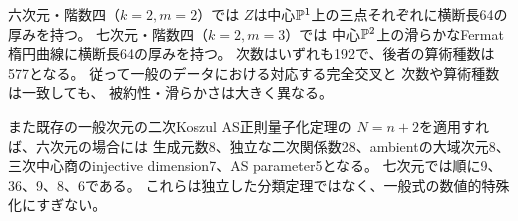 六次元・階数四（$k=2,m=2$）では
$Z$は中心$\mathbb P^1$上の三点それぞれに横断長64の厚みを持つ。
七次元・階数四（$k=2,m=3$）では
中心$\mathbb P^2$上の滑らかなFermat楕円曲線に横断長64の厚みを持つ。
次数はいずれも192で、後者の算術種数は577となる。
従って一般のデータにおける対応する完全交叉と
次数や算術種数は一致しても、
被約性・滑らかさは大きく異なる。

また既存の一般次元の二次Koszul AS正則量子化定理の
$N=n+2$を適用すれば、六次元の場合には
生成元数8、独立な二次関係数28、ambientの大域次元8、
三次中心商のinjective dimension7、AS parameter5となる。
七次元では順に9、36、9、8、6である。
これらは独立した分類定理ではなく、一般式の数値的特殊化にすぎない。
